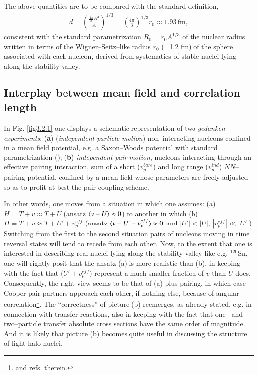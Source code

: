 The above quantities are to be compared with the standard definition,
\begin{align}\label{eq3.2.27}
d=\left(\frac{\frac{4\pi}{3}R^3}{A}\right)^{1/3}=\left(\frac{4\pi}{3}\right)^{1/3}r_0\approx 1.93\, \text{fm},
\end{align} 
consistent with the standard parametrization $R_0=r_0A^{1/3}$ of the nuclear radius written in terms of the Wigner--Seitz--like radius $r_0$ (=1.2 fm) of the sphere associated with each nucleon, derived from systematics of stable nuclei lying along the stability valley.
\subsection{Interplay between mean field and correlation length}
In Fig. \ref{fig3.2.1} one displays a schematic representation of two \textit{gedanken experiments}: (\textbf{a}) (\textit{independent particle motion}) non--interacting nucleons confined in a mean field potential, e.g. a Saxon--Woods potential with standard parametrization (\cite{Bohr:69}); (\textbf{b}) \textit{independent pair motion}, nucleons interacting through an effective pairing interaction, sum of a short ($v_p^{bare}$) and long range ($v_p^{ind}$) $NN$--pairing potential, confined by a mean field whose parameters are freely adjusted so as to profit at best the pair coupling scheme.


In other words, one moves from a situation in which one assumes: (a)$H=T+v\approx T+U$ (ansatz $\langle {v-U} \rangle\approx 0$) to another in which (b) $H=T+v\approx T+U'+v_p^{eff}$ (ansatz $\langle {v-U'-v_p^{eff}} \rangle\approx 0$ and $|U'|<|U|$, $|v_p^{eff}|\ll|U'|$). Switching from the first to the second situation pairs of nucleons moving in time reversal states will tend to recede from each other. Now, to the extent that one is interested in describing real nuclei lying along the stability valley like e.g. $^{120}$Sn, one will rightly posit that the ansatz (a) is more realistic  than (b), in keeping with the fact that ($U'+v_p^{eff}$) represent a much smaller fraction of $v$ than $U$ does. Consequently, the right view seems to be that of (a) plus pairing, in which case Cooper pair partners approach each other, if nothing else, because of angular correlation\footnote{\cite{Bertsch:67,Ferreira:84,Matsuo:13} and refs. therein.}. The ``correctness'' of picture (b) reemerges, as already stated, e.g. in connection with transfer reactions, also in keeping with the fact that one-- and two--particle transfer  absolute cross sections have the same order of magnitude. And it is likely that picture (b) becomes quite useful  in discussing the structure of light halo nuclei.


